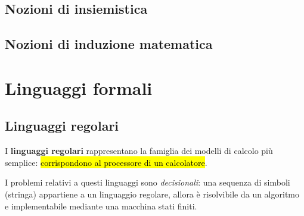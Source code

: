 \documentclass[12pt, a4paper, oneside]{book}
\begin{document}

    \section{Nozioni di insiemistica}

    \section{Nozioni di induzione matematica}





    \chapter{Linguaggi formali}

    \section{Linguaggi regolari}
    I \textbf{linguaggi regolari} rappresentano la famiglia dei modelli di calcolo più semplice: \hl{corrispondono al processore di un calcolatore}.

    I problemi relativi a questi linguaggi sono \textit{decisionali}: una sequenza di simboli (stringa) appartiene a un linguaggio regolare, allora è risolvibile da un algoritmo e implementabile mediante una macchina stati finiti.


\end{document}
